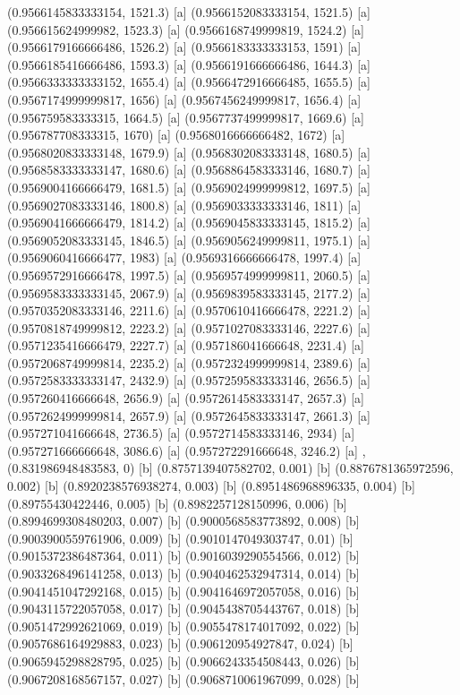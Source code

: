 {{{(0.9566145833333154, 1521.3) [a] 
(0.9566152083333154, 1521.5) [a] 
(0.956615624999982, 1523.3) [a] 
(0.9566168749999819, 1524.2) [a] 
(0.9566179166666486, 1526.2) [a] 
(0.9566183333333153, 1591) [a] 
(0.9566185416666486, 1593.3) [a] 
(0.9566191666666486, 1644.3) [a] 
(0.9566333333333152, 1655.4) [a] 
(0.9566472916666485, 1655.5) [a] 
(0.9567174999999817, 1656) [a] 
(0.9567456249999817, 1656.4) [a] 
(0.956759583333315, 1664.5) [a] 
(0.9567737499999817, 1669.6) [a] 
(0.956787708333315, 1670) [a] 
(0.9568016666666482, 1672) [a] 
(0.9568020833333148, 1679.9) [a] 
(0.9568302083333148, 1680.5) [a] 
(0.9568583333333147, 1680.6) [a] 
(0.9568864583333146, 1680.7) [a] 
(0.9569004166666479, 1681.5) [a] 
(0.9569024999999812, 1697.5) [a] 
(0.9569027083333146, 1800.8) [a] 
(0.9569033333333146, 1811) [a] 
(0.9569041666666479, 1814.2) [a] 
(0.9569045833333145, 1815.2) [a] 
(0.9569052083333145, 1846.5) [a] 
(0.9569056249999811, 1975.1) [a] 
(0.9569060416666477, 1983) [a] 
(0.9569316666666478, 1997.4) [a] 
(0.9569572916666478, 1997.5) [a] 
(0.9569574999999811, 2060.5) [a] 
(0.9569583333333145, 2067.9) [a] 
(0.9569839583333145, 2177.2) [a] 
(0.9570352083333146, 2211.6) [a] 
(0.9570610416666478, 2221.2) [a] 
(0.9570818749999812, 2223.2) [a] 
(0.9571027083333146, 2227.6) [a] 
(0.9571235416666479, 2227.7) [a] 
(0.957186041666648, 2231.4) [a] 
(0.9572068749999814, 2235.2) [a] 
(0.9572324999999814, 2389.6) [a] 
(0.9572583333333147, 2432.9) [a] 
(0.9572595833333146, 2656.5) [a] 
(0.957260416666648, 2656.9) [a] 
(0.9572614583333147, 2657.3) [a] 
(0.9572624999999814, 2657.9) [a] 
(0.9572645833333147, 2661.3) [a] 
(0.957271041666648, 2736.5) [a] 
(0.9572714583333146, 2934) [a] 
(0.957271666666648, 3086.6) [a] 
(0.957272291666648, 3246.2) [a] 
},{(0.831986948483583, 0) [b] 
(0.8757139407582702, 0.001) [b] 
(0.8876781365972596, 0.002) [b] 
(0.8920238576938274, 0.003) [b] 
(0.8951486968896335, 0.004) [b] 
(0.89755430422446, 0.005) [b] 
(0.8982257128150996, 0.006) [b] 
(0.8994699308480203, 0.007) [b] 
(0.9000568583773892, 0.008) [b] 
(0.9003900559761906, 0.009) [b] 
(0.9010147049303747, 0.01) [b] 
(0.9015372386487364, 0.011) [b] 
(0.9016039290554566, 0.012) [b] 
(0.9033268496141258, 0.013) [b] 
(0.9040462532947314, 0.014) [b] 
(0.9041451047292168, 0.015) [b] 
(0.9041646972057058, 0.016) [b] 
(0.9043115722057058, 0.017) [b] 
(0.9045438705443767, 0.018) [b] 
(0.9051472992621069, 0.019) [b] 
(0.9055478174017092, 0.022) [b] 
(0.9057686164929883, 0.023) [b] 
(0.906120954927847, 0.024) [b] 
(0.9065945298828795, 0.025) [b] 
(0.9066243354508443, 0.026) [b] 
(0.9067208168567157, 0.027) [b] 
(0.9068710061967099, 0.028) [b] 
}}}
